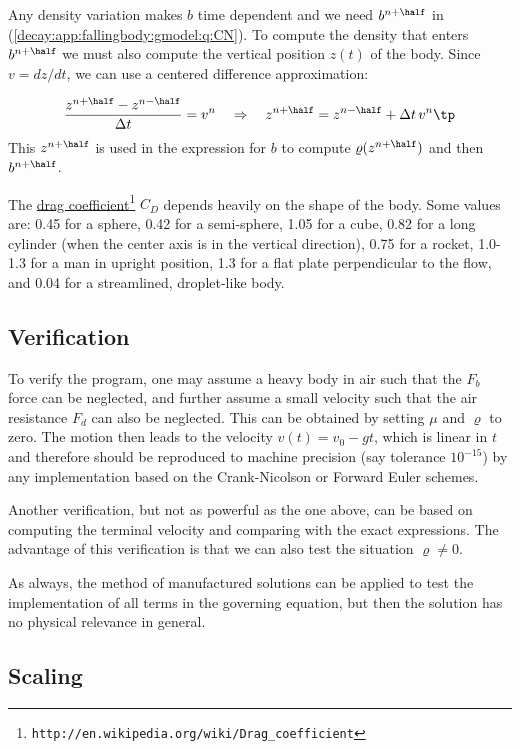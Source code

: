 \documentclass[graybox,sectrefs,envcountresetchap,open=right,final]{svmonodo}
\begin{document}
Any density variation makes $b$ time dependent and we need
$b^{n+\half}$ in (\ref{decay:app:fallingbody:gmodel:q:CN}).
To compute the density that enters
$b^{n+\half}$ we must also compute the vertical
position $z(t)$ of the body. Since $v=dz/dt$, we can use a centered
difference approximation:

\[ \frac{z^{n+\half} - z^{n-\half}}{\Delta t} = v^n
\quad\Rightarrow\quad z^{n+\half} = z^{n-\half}+\Delta t\, v^n\tp\]
This $z^{n+\half}$ is used in the expression for $b$
to compute $\varrho(z^{n+\half})$ and then $b^{n+\half}$.

The \href{{http://en.wikipedia.org/wiki/Drag_coefficient}}{drag coefficient}\footnote{\texttt{http://en.wikipedia.org/wiki/Drag\_coefficient}} $C_D$ depends heavily
on the shape of the body.  Some values are: 0.45 for a sphere, 0.42
for a semi-sphere, 1.05 for a cube, 0.82 for a long cylinder (when the
center axis is in the vertical direction), 0.75 for a rocket,
1.0-1.3 for a man in upright position, 1.3 for a flat plate perpendicular
to the flow, and
0.04 for a streamlined, droplet-like body.

\subsection{Verification}

To verify the program, one may assume a heavy body in air such that the $F_b$
force can be neglected, and further assume a small velocity such that the
air resistance $F_d$ can also be neglected. This can be obtained by
setting $\mu$ and $\varrho$ to zero. The motion then leads to
the velocity
$v(t)=v_0 - gt$, which is linear in $t$ and therefore should be
reproduced to machine precision (say tolerance $10^{-15}$) by any
implementation based on the Crank-Nicolson or Forward Euler schemes.

Another verification, but not as powerful as the one above,
can be based on computing the terminal velocity and comparing with
the exact expressions.
The advantage of this verification is that we can also
test the situation $\varrho\neq 0$.

As always, the method of manufactured solutions can be applied to
test the implementation of all terms in the governing equation, but
then the solution has no physical relevance in general.


\subsection{Scaling}
\label{decay:app:drag:scaling}
\end{document}
